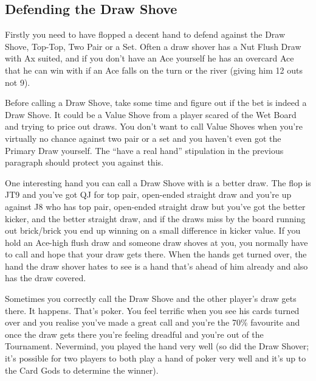 \subsection{Defending the Draw Shove}

Firstly you need to have flopped a decent hand to defend against
the Draw Shove, Top-Top, Two Pair or a Set. Often a draw shover
has a Nut Flush Draw with Ax suited, and if you don't have an Ace
yourself he has an overcard Ace that he can win with if an Ace
falls on the turn or the river (giving him 12 outs not 9).

Before calling a Draw Shove, take some time and figure out if the
bet is indeed a Draw Shove. It could be a Value Shove from a player
scared of the Wet Board and trying to price out draws. You don't
want to call Value Shoves when you're virtually no chance against
two pair or a set and you haven't even got the Primary Draw yourself.
The ``have a real hand'' stipulation in the previous paragraph should
protect you against this.

One interesting hand you can call a Draw Shove with is a better draw.
The flop is JT9 and you've got QJ for top pair, open-ended straight
draw and you're up against J8 who has top pair, open-ended straight
draw but you've got the better kicker, and the better straight draw,
and if the draws miss by the board running out brick/brick you end up
winning on a small difference in kicker value. If you hold an Ace-high
flush draw and someone draw shoves at you, you normally have to call
and hope that your draw gets there. When the hands get turned over,
the hand the draw shover hates to see is a hand that's ahead of him
already and also has the draw covered.

Sometimes you correctly call the Draw Shove and the other player's
draw gets there. It happens. That's poker. You feel terrific when
you see his cards turned over and you realise you've made a great
call and you're the 70\% favourite and once the draw gets there
you're feeling dreadful and you're out of the Tournament. Nevermind,
you played the hand very well (so did the Draw Shover;
it's possible for two players to both play a hand of poker very well
and it's up to the Card Gods to determine the winner).


